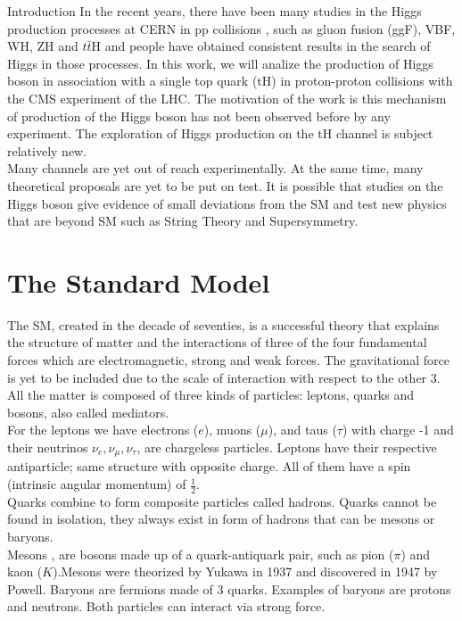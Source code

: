\begin{chapter}{Introduction}
In the recent years, there have been many studies in the Higgs production processes at CERN in pp collisions , such as gluon fusion (ggF), VBF, WH, ZH and $t\bar{t}$H and people have obtained consistent results in the search of Higgs in those processes. 
In this work, we will analize the production of Higgs boson in association with a
single top quark (tH) in proton-proton collisions with the CMS experiment of the LHC. 
The motivation of the work is this mechanism of production of the Higgs boson has not been observed before by any experiment. The exploration of Higgs production on the tH channel is subject relatively new. %
\\
Many channels are yet out of
reach experimentally. At the same time, many theoretical
proposals are yet to be put on test. It is possible that studies on the Higgs boson give evidence of small deviations from the SM  and test new physics that are beyond SM such as String Theory and  Supersymmetry. \\


\section{The Standard Model}  %
The SM, created in the decade of seventies, is a successful theory that explains the structure of matter and the interactions of three of the four fundamental forces which are electromagnetic, strong and weak forces. The gravitational force is yet to be included due to the scale of interaction with respect to the other 3.  All the matter is composed of three kinds of particles: leptons, quarks and bosons, also called mediators.\\

For the leptons we have electrons ($e$), muons ($\mu$), and taus ($\tau$) with charge -1 and their neutrinos $\nu_e, \nu_\mu,\nu_\tau$, are chargeless particles. Leptons have their respective antiparticle; same structure with opposite charge. 
 All of them have a spin (intrinsic angular momentum) of $\frac{1}{2}$\cite{griff}.%
\\

 Quarks combine to form composite particles called hadrons. Quarks cannot be found in isolation, they always exist in form of hadrons that can be mesons or baryons. \\
Mesons , are bosons made up of a quark-antiquark pair, such as pion ($\pi$) and kaon ($K$).Mesons were theorized by Yukawa in 1937 and discovered in 1947 by Powell. \cite{griff}
Baryons are fermions made of 3 quarks. Examples of baryons are protons and neutrons. Both particles can interact via strong force.
\\


\end{chapter}
